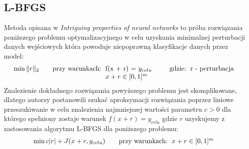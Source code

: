 \documentclass{article}
\begin{document}
\subsection{L-BFGS}
Metoda opisana w \textit{Intriguing properties of neural networks}\cite{DBLP:journals/corr/SzegedyZSBEGF13}
to próba rozwiązania poniższego problemu optymalizacyjnego w celu uzyskania minimalnej perturbacji danych wejściowych
która powoduje niepoprawną klasyfikacje danych przez model:
    \begin{equation}
    \min{\| r\|_{2}}
    \qquad\text{przy warunkach:}
    \begin{tabular}[t]{ll}
    f(x + r) = $y_{celu}$ \\
    $x+r \in [0,1]^{m}$ \\
    \end{tabular}
    \qquad\text{gdzie:}
    \begin{tabular}[t]{ll}
    r - perturbacja \\
    \end{tabular}
    \end{equation}
Znalezienie dokładnego rozwiązania powyższego problemu jest skomplikowane, dlatego autorzy postanowili szukać aproksymacji
rozwiązania poprzez liniowe przeszukiwanie w celu znalezienia najmniejszej wartości parametru $c > 0$ dla którego spełniony
zostaje warunek $f(x+r) = y_{celu}$ gdzie $r$ uzyskujemy z zastosowania algorytmu L-BFGS dla poniższego problemu:
    \begin{equation}
    \min{c| r| + J(x+r, y_{celu})}
    \qquad\text{przy warunkach:}
    \begin{tabular}[t]{ll}
    $x+r \in [0,1]^{m}$ \\
    \end{tabular}
    \end{equation}
\end{document}
